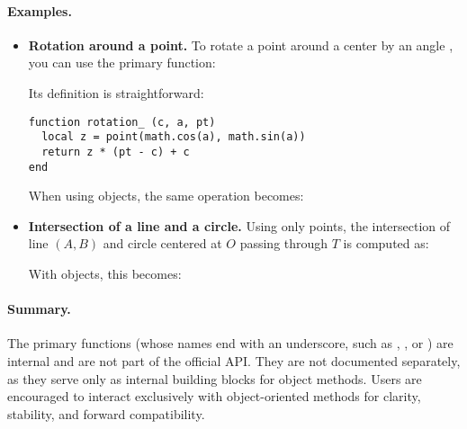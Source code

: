 \paragraph{Examples.}

\begin{itemize}
  \item \textbf{Rotation around a point.}  
  To rotate a point  around a center  by an angle , you can use the primary function:
  \begin{center}
  \end{center}

  Its definition is straightforward:
  
  \begin{center}
  \begin{minipage}{0.6\textwidth}
  \begin{mybox}
  \begin{verbatim}
function rotation_ (c, a, pt)
  local z = point(math.cos(a), math.sin(a))
  return z * (pt - c) + c
end
  \end{verbatim}
  \end{mybox}
  \end{minipage}
  \end{center}

  When using objects, the same operation becomes:
  \begin{center}
  \end{center}

  \item \textbf{Intersection of a line and a circle.}  
  Using only points, the intersection of line $(A,B)$ and circle centered at $O$ passing through $T$ is computed as:
  \begin{center}
  \end{center}

  With objects, this becomes:
  \begin{center}
  \end{center}
\end{itemize}

\vspace{1em}
\paragraph{Summary.}

The primary functions (whose names end with an underscore, such as , , or ) are internal and are not part of the official API. They are not documented separately, as they serve only as internal building blocks for object methods. Users are encouraged to interact exclusively with object-oriented methods for clarity, stability, and forward compatibility.



\endinput